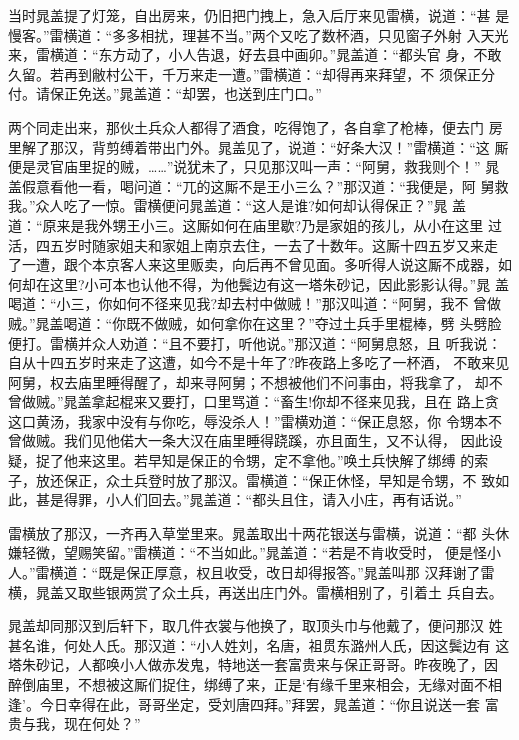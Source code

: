 当时晁盖提了灯笼，自出房来，仍旧把门拽上，急入后厅来见雷横，说道：“甚
是慢客。”雷横道：“多多相扰，理甚不当。”两个又吃了数杯酒，只见窗子外射
入天光来，雷横道：“东方动了，小人告退，好去县中画卯。”晁盖道：“都头官
身，不敢久留。若再到敝村公干，千万来走一遭。”雷横道：“却得再来拜望，不
须保正分付。请保正免送。”晁盖道：“却罢，也送到庄门口。”

两个同走出来，那伙土兵众人都得了酒食，吃得饱了，各自拿了枪棒，便去门
房里解了那汉，背剪缚着带出门外。晁盖见了，说道：“好条大汉！”雷横道：“这
厮便是灵官庙里捉的贼，……”说犹未了，只见那汉叫一声：“阿舅，救我则个！”
晁盖假意看他一看，喝问道：“兀的这厮不是王小三么？”那汉道：“我便是，阿
舅救我。”众人吃了一惊。雷横便问晁盖道：“这人是谁?如何却认得保正？”晁
盖道：“原来是我外甥王小三。这厮如何在庙里歇?乃是家姐的孩儿，从小在这里
过活，四五岁时随家姐夫和家姐上南京去住，一去了十数年。这厮十四五岁又来走
了一遭，跟个本京客人来这里贩卖，向后再不曾见面。多听得人说这厮不成器，如
何却在这里?小可本也认他不得，为他鬓边有这一塔朱砂记，因此影影认得。”晁
盖喝道：“小三，你如何不径来见我?却去村中做贼！”那汉叫道：“阿舅，我不
曾做贼。”晁盖喝道：“你既不做贼，如何拿你在这里？”夺过土兵手里棍棒，劈
头劈脸便打。雷横并众人劝道：“且不要打，听他说。”那汉道：“阿舅息怒，且
听我说：自从十四五岁时来走了这遭，如今不是十年了?昨夜路上多吃了一杯酒，
不敢来见阿舅，权去庙里睡得醒了，却来寻阿舅；不想被他们不问事由，将我拿了，
却不曾做贼。”晁盖拿起棍来又要打，口里骂道：“畜生!你却不径来见我，且在
路上贪这口黄汤，我家中没有与你吃，辱没杀人！”雷横劝道：“保正息怒，你
令甥本不曾做贼。我们见他偌大一条大汉在庙里睡得跷蹊，亦且面生，又不认得，
因此设疑，捉了他来这里。若早知是保正的令甥，定不拿他。”唤土兵快解了绑缚
的索子，放还保正，众土兵登时放了那汉。雷横道：“保正休怪，早知是令甥，不
致如此，甚是得罪，小人们回去。”晁盖道：“都头且住，请入小庄，再有话说。”

雷横放了那汉，一齐再入草堂里来。晁盖取出十两花银送与雷横，说道：“都
头休嫌轻微，望赐笑留。”雷横道：“不当如此。”晁盖道：“若是不肯收受时，
便是怪小人。”雷横道：“既是保正厚意，权且收受，改日却得报答。”晁盖叫那
汉拜谢了雷横，晁盖又取些银两赏了众土兵，再送出庄门外。雷横相别了，引着土
兵自去。

晁盖却同那汉到后轩下，取几件衣裳与他换了，取顶头巾与他戴了，便问那汉
姓甚名谁，何处人氏。那汉道：“小人姓刘，名唐，祖贯东潞州人氏，因这鬓边有
这塔朱砂记，人都唤小人做赤发鬼，特地送一套富贵来与保正哥哥。昨夜晚了，因
醉倒庙里，不想被这厮们捉住，绑缚了来，正是‘有缘千里来相会，无缘对面不相
逢’。今日幸得在此，哥哥坐定，受刘唐四拜。”拜罢，晁盖道：“你且说送一套
富贵与我，现在何处？”

